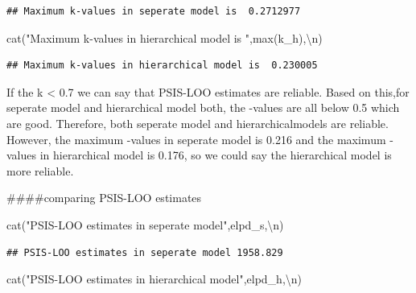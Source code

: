 \documentclass[
]{article}
\newenvironment{Shaded}{\begin{snugshade}}{\end{snugshade}}
\newcommand{\FunctionTok}[1]{\textcolor[rgb]{0.00,0.00,0.00}{#1}}
\newcommand{\NormalTok}[1]{#1}
\newcommand{\SpecialCharTok}[1]{\textcolor[rgb]{0.00,0.00,0.00}{#1}}
\newcommand{\StringTok}[1]{\textcolor[rgb]{0.31,0.60,0.02}{#1}}
\begin{document}
\begin{verbatim}
## Maximum k-values in seperate model is  0.2712977
\end{verbatim}

\begin{Shaded}
\begin{Highlighting}[]
\FunctionTok{cat}\NormalTok{(}\StringTok{"Maximum k{-}values in hierarchical model is "}\NormalTok{,}\FunctionTok{max}\NormalTok{(k\_h),}\StringTok{\textquotesingle{}}\SpecialCharTok{\textbackslash{}n}\StringTok{\textquotesingle{}}\NormalTok{)}
\end{Highlighting}
\end{Shaded}

\begin{verbatim}
## Maximum k-values in hierarchical model is  0.230005
\end{verbatim}

If the k \textless{} 0.7 we can say that PSIS-LOO estimates are
reliable. Based on this,for seperate model and hierarchical model both,
the -values are all below 0.5 which are good. Therefore, both
seperate model and hierarchicalmodels are reliable. However, the maximum
-values in seperate model is 0.216 and the maximum -values
in hierarchical model is 0.176, so we could say the hierarchical model
is more reliable.

\#\#\#\#comparing PSIS-LOO estimates

\begin{Shaded}
\begin{Highlighting}[]
\FunctionTok{cat}\NormalTok{(}\StringTok{"PSIS{-}LOO estimates in seperate model"}\NormalTok{,elpd\_s,}\StringTok{\textquotesingle{}}\SpecialCharTok{\textbackslash{}n}\StringTok{\textquotesingle{}}\NormalTok{)}
\end{Highlighting}
\end{Shaded}

\begin{verbatim}
## PSIS-LOO estimates in seperate model 1958.829
\end{verbatim}

\begin{Shaded}
\begin{Highlighting}[]
\FunctionTok{cat}\NormalTok{(}\StringTok{"PSIS{-}LOO estimates in hierarchical model"}\NormalTok{,elpd\_h,}\StringTok{\textquotesingle{}}\SpecialCharTok{\textbackslash{}n}\StringTok{\textquotesingle{}}\NormalTok{)}
\end{Highlighting}
\end{Shaded}
\end{document}
